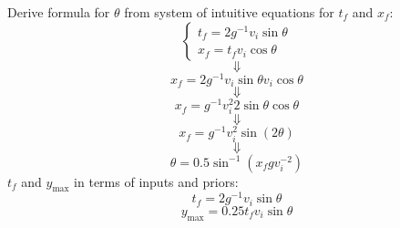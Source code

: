 
Derive formula for $\theta$ from system of intuitive equations
for $t_f$ and $x_f$:
$$\begin{cases}
t_f = 2 g^{-1} v_i \sin \theta \\
x_f = t_f v_i \cos \theta 
\end{cases}$$
$$\Downarrow$$
$$ x_f = 2 g^{-1} v_i \sin \theta v_i \cos \theta $$
$$\Downarrow$$
$$ x_f = g^{-1} v_i^2 2 \sin \theta \cos \theta $$
$$\Downarrow$$
$$ x_f = g^{-1} v_i^2 \sin (2\theta) $$
$$\Downarrow$$
\begin{equation} 
\theta = 0.5 \sin^{-1}\left(x_f g v_i^{-2}\right)
\end{equation}
$t_f$ and $y_{\text{max}}$ in terms of inputs and priors:
\begin{equation}
t_f = 2 g^{-1} v_i \sin \theta 
\end{equation}
\begin{equation}
y_{\text{max}} = 0.25 t_f v_i \sin \theta
\end{equation}